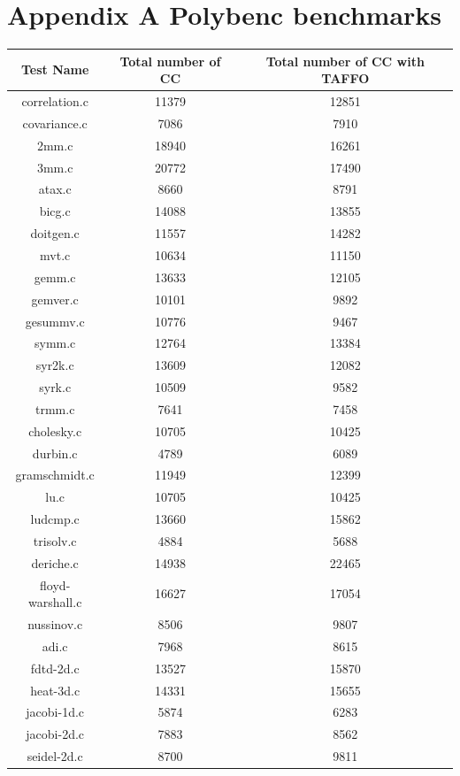 \newpage
\begin{table}[ht]
\section{\fontsize{12}{15}\selectfont Appendix A Polybenc benchmarks}
\begin{center}
\begin{tabular}{ |c|c|c| } 
 \hline
Test Name & Total number of CC & Total number of CC with TAFFO \\
 \hline
 correlation.c & 11379 & 12851 \\
 \hline
  covariance.c & 7086 & 7910 \\
 \hline
  2mm.c & 18940 & 16261 \\
 \hline
  3mm.c & 20772 & 17490 \\
 \hline
  atax.c & 8660 & 8791 \\
 \hline
  bicg.c & 14088 & 13855 \\
 \hline
  doitgen.c & 11557 & 14282 \\
 \hline
  mvt.c & 10634 & 11150 \\
 \hline
  gemm.c & 13633 & 12105 \\
 \hline
  gemver.c & 10101 & 9892 \\
 \hline
  gesummv.c & 10776 & 9467 \\
 \hline
  symm.c & 12764 & 13384 \\
 \hline
  syr2k.c & 13609 & 12082 \\
 \hline
  syrk.c & 10509 & 9582 \\
 \hline
  trmm.c & 7641 & 7458 \\
 \hline
  cholesky.c & 10705 & 10425 \\
 \hline
  durbin.c & 4789 & 6089 \\
 \hline
  gramschmidt.c & 11949 & 12399 \\
 \hline
  lu.c & 10705 & 10425 \\
 \hline
  ludcmp.c & 13660 & 15862 \\
 \hline
  trisolv.c & 4884 & 5688 \\
 \hline
  deriche.c & 14938 & 22465 \\
 \hline
  floyd-warshall.c & 16627 & 17054 \\
 \hline
  nussinov.c & 8506 & 9807 \\
 \hline
  adi.c & 7968 & 8615 \\
 \hline
  fdtd-2d.c & 13527 & 15870 \\
 \hline
  heat-3d.c & 14331 & 15655 \\
 \hline
  jacobi-1d.c & 5874 & 6283 \\
 \hline
  jacobi-2d.c & 7883 & 8562 \\
 \hline
  seidel-2d.c & 8700 & 9811 \\
 \hline
 
 
\end{tabular}
\end{center}
\end{table}

